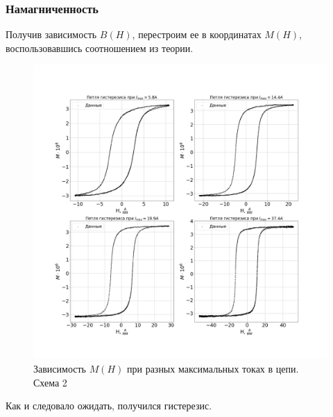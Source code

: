 \documentclass[a4paper,14pt]{extarticle}
\begin{document}
	\subsubsection{Намагниченность}
	Получив зависимость $B(H)$, перестроим ее в координатах $M(H)$, воспользовавшись соотношением из теории.
	\begin{figure}[h]
		\centering
		\includegraphics[width=1.0\linewidth]{Lab2_4.png}
		\caption{Зависимость $M(H)$ при разных максимальных токах в цепи. Схема 2}
		\label{fig7}
	\end{figure}
	Как и следовало ожидать, получился гистерезис.
\end{document}
